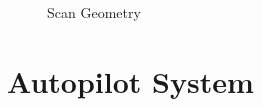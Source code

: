 \documentclass[a4paper,11pt]{report}
\begin{document}
\begin{figure}[ht]
  \centering
  \caption{Scan Geometry}
  \label{fig:geometry}
\end{figure}

\section{Autopilot System}
\label{sec:paparazzi}
\end{document}
